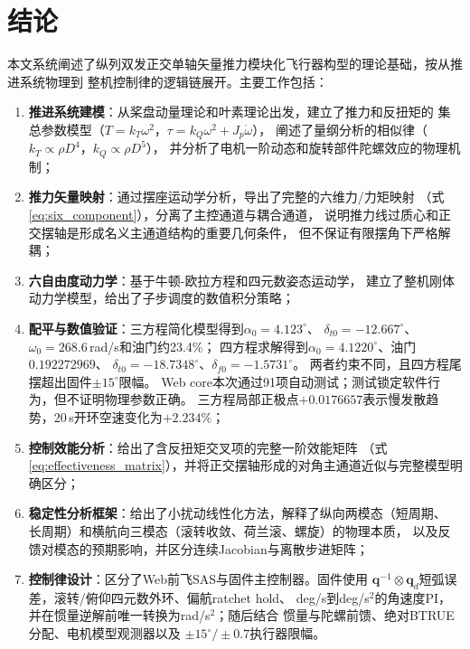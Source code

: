 \section{结论}
\label{sec:conclusion}

本文系统阐述了纵列双发正交单轴矢量推力模块化飞行器构型的理论基础，按从推进系统物理到
整机控制律的逻辑链展开。主要工作包括：

\begin{enumerate}[label=(\arabic*)]
    \item \textbf{推进系统建模}：从桨盘动量理论和叶素理论出发，建立了推力和反扭矩的
          集总参数模型（$T = k_T\omega^2$，$\tau = k_Q\omega^2 + J_p\dot{\omega}$），
          阐述了量纲分析的相似律（$k_T \propto \rho D^4$，$k_Q \propto \rho D^5$），
          并分析了电机一阶动态和旋转部件陀螺效应的物理机制；
    \item \textbf{推力矢量映射}：通过摆座运动学分析，导出了完整的六维力/力矩映射
          （式\ref{eq:six_component}），分离了主控通道与耦合通道，
          说明推力线过质心和正交摆轴是形成名义主通道结构的重要几何条件，
          但不保证有限摆角下严格解耦；
    \item \textbf{六自由度动力学}：基于牛顿-欧拉方程和四元数姿态运动学，
          建立了整机刚体动力学模型，给出了子步调度的数值积分策略；
    \item \textbf{配平与数值验证}：三方程简化模型得到$\alpha_0=4.123^\circ$、
          $\delta_{t0}=-12.667^\circ$、$\omega_0=268.6$\,rad/s和油门约23.4\%；
          四方程求解得到$\alpha_0=4.1220^\circ$、油门$0.192272969$、
          $\delta_{t0}=-18.7348^\circ$、$\delta_{f0}=-1.5731^\circ$。
          两者约束不同，且四方程尾摆超出固件$\pm15^\circ$限幅。
          Web core本次通过91项自动测试；测试锁定软件行为，但不证明物理参数正确。
          三方程局部正极点$+0.0176657$表示慢发散趋势，20\,s开环空速变化为$+2.234\%$；
    \item \textbf{控制效能分析}：给出了含反扭矩交叉项的完整一阶效能矩阵
          （式\ref{eq:effectiveness_matrix}），并将正交摆轴形成的对角主通道近似与完整模型明确区分；
    \item \textbf{稳定性分析框架}：给出了小扰动线性化方法，解释了纵向两模态（短周期、
          长周期）和横航向三模态（滚转收敛、荷兰滚、螺旋）的物理本质，
          以及反馈对模态的预期影响，并区分连续Jacobian与离散步进矩阵；
    \item \textbf{控制律设计}：区分了Web前飞SAS与固件主控制器。固件使用
          $\bm q^{-1}\otimes\bm q_d$短弧误差，滚转/俯仰四元数外环、偏航ratchet hold、
          deg/s到deg/s$^2$的角速度PI，并在惯量逆解前唯一转换为rad/s$^2$；随后结合
          惯量与陀螺前馈、绝对BTRUE分配、电机模型观测器以及
          $\pm15^\circ/\pm0.7$执行器限幅。
\end{enumerate}

